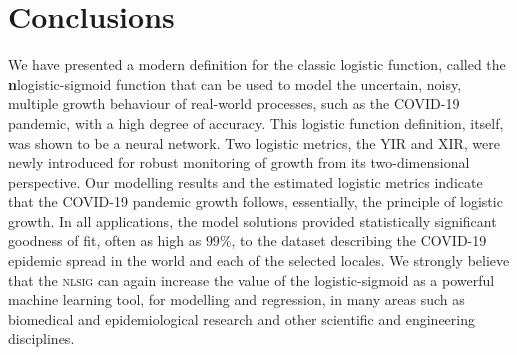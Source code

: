 \documentclass[journal]{IEEEtran}
\theoremstyle{plain}
\theoremstyle{definition}
\theoremstyle{remark}
\begin{document}
\section{Conclusions}\label{sec_concls}
We have presented a modern definition for the classic logistic function, called the \textbf{n}logistic-sigmoid function that can be used to model the uncertain, noisy, multiple growth behaviour of real-world processes, such as the COVID-19 pandemic, with a high degree of accuracy. This logistic function definition, itself, was shown to be a neural network. Two logistic metrics, the YIR and XIR, were newly introduced for robust monitoring of growth from its two-dimensional perspective. Our modelling results and the estimated logistic metrics indicate that the COVID-19 pandemic growth follows, essentially, the principle of logistic growth. In all applications, the model solutions provided statistically significant goodness of fit, often as high as $99\%$, to the dataset describing the COVID-19 epidemic spread in the world and each of the selected locales. We strongly believe that the \textsc{nlsig} can again increase the value of the logistic-sigmoid as a powerful  machine learning tool, for modelling and regression, in many areas such as biomedical and epidemiological research and other scientific and engineering disciplines.






\end{document}

